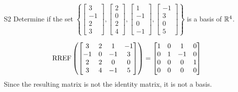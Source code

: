 \documentclass{sbgLAexam}
\begin{document}
\begin{problem}{S2}
  Determine if the set \(\left\{
    \begin{bmatrix} 3 \\ -1 \\ 2 \\3 \end{bmatrix},
    \begin{bmatrix} 2 \\ 0 \\ 2 \\ 4\end{bmatrix},
    \begin{bmatrix} 1 \\ -1 \\ 0 \\ -1\end{bmatrix},
    \begin{bmatrix} -1 \\ 3 \\ 0 \\ 5\end{bmatrix}
  \right\}\) is a basis of $\mathbb{R}^4$.
\end{problem}
\begin{solution}
  \[\operatorname{RREF}\left(
    \begin{bmatrix}
      3 & 2 & 1 & -1\\
      -1 & 0 & -1 & 3\\
      2 & 2 & 0 & 0\\
      3 & 4 & -1 & 5\\
    \end{bmatrix} \right)= \begin{bmatrix}
      1 & 0 & 1 & 0 \\
      0 & 1 & -1 & 0 \\
      0 & 0 & 0 & 1 \\
      0 & 0 & 0 & 0
    \end{bmatrix}
  \]
Since the resulting matrix is not the identity matrix, it is not a basis.
\end{solution}
\end{document}

